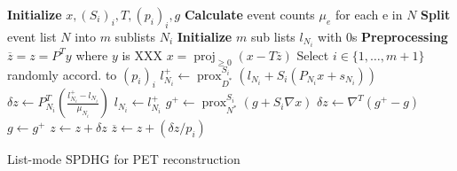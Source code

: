 \documentclass{IEEEtran}
\DeclareMathOperator{\proj}{proj}
\DeclareMathOperator{\prox}{prox}
\begin{document}
\begin{algorithm}[t]
\begin{algorithmic}[1]
\State \textbf{Initialize} $x,(S_i)_i,T,(p_i)_i,g$
\State \textbf{Calculate} event counts $\mu_e$ for each e in $N$
\State \textbf{Split} event list $N$ into $m$ sublists $N_i$
\State \textbf{Initialize} $m$ sub lists $l_{N_i}$ with 0s
\State \textbf{Preprocessing} $\overline{z} = z = P^T y$ where $y$ is XXX
\Repeat
	\State $x = \proj_{\geq 0} (x - T \overline{z})$
	\State Select $i \in \{1,\ldots,m+1\}$ randomly accord. to $(p_i)_i$
	  \State $l_{N_i}^+ \gets \prox_{D^*}^{S_i} \left( l_{N_i} + S_i \left(P_{N_i} x + s_{N_i} \right) \right)$
	  \State $\delta z \gets P_{N_i}^T \left(\frac{l_{N_i}^+ - l_{N_i}}{\mu_{N_i}}\right)$
	  \State $l_{N_i} \gets l_{N_i}^+$
  \Else
	  \State $g^+ \gets \prox_{N^*}^{S_i} \left( g + S_i \nabla x \right)$
	  \State $\delta z \gets \nabla^T \left(g^+ - g\right)$
	  \State $g \gets g^+$
  \EndIf
	\State $z \gets z + \delta z$
	\State $\overline{z} \gets  z + (\delta z/p_i)$
\State {}
\end{algorithmic}
\caption{List-mode SPDHG for PET reconstruction}
\label{alg:spdhg}
\end{algorithm}
\end{document}
